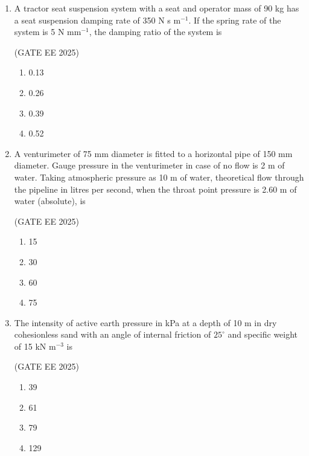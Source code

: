 \documentclass[journal,12pt,onecolumn]{IEEEtran}
\theoremstyle{remark}
\begin{document}
\begin{enumerate}
    \item A tractor seat suspension system with a seat and operator mass of 90 kg has a seat suspension damping rate of 350 N s m$^{-1}$. 
    If the spring rate of the system is 5 N mm$^{-1}$, the damping ratio of the system is

    \hfill(GATE EE 2025)
    
    \begin{multicols}{4}
    \begin{enumerate}
        \item 0.13
        \item 0.26
        \item 0.39
        \item 0.52
    \end{enumerate}
    \end{multicols}

    \item A venturimeter of 75 mm diameter is fitted to a horizontal pipe of 150 mm diameter. 
    Gauge pressure in the venturimeter in case of no flow is 2 m of water. Taking atmospheric pressure as 10 m of water, 
    theoretical flow through the pipeline in litres per second, when the throat point pressure is 2.60 m of water (absolute), is

    \hfill(GATE EE 2025)
    
    \begin{multicols}{4}
    \begin{enumerate}
        \item 15
        \item 30
        \item 60
        \item 75
    \end{enumerate}
    \end{multicols}


\item The intensity of active earth pressure in kPa at a depth of 10 m in dry cohesionless sand with an angle of internal friction of $25^\circ$ and specific weight of 15 kN m$^{-3}$ is

\hfill(GATE EE 2025)

\begin{multicols}{4}
\begin{enumerate}
\item 39
\item 61
\item 79
\item 129
\end{enumerate}
\end{multicols}


\end{enumerate}
\end{document}
